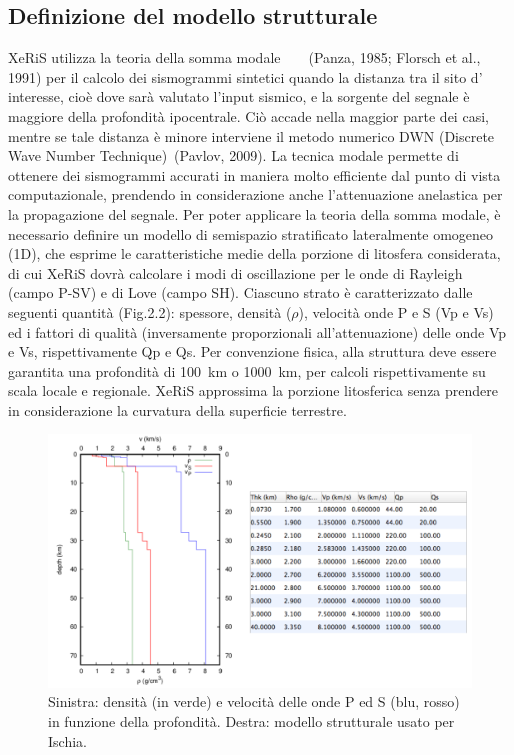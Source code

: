 \documentclass[a4paper,12pt,titlepage]{article}
\begin{document}
\subsection{Definizione del modello strutturale}
XeRiS utilizza la teoria della somma modale ~\nocite{Panza1985} ~\nocite{Florsch} (Panza, 1985; Florsch et al., 1991) per il calcolo dei sismogrammi sintetici quando la distanza tra il sito d' interesse, cioè dove sarà valutato l'input sismico, e la sorgente del segnale è maggiore della profondità ipocentrale. Ciò accade nella maggior parte dei casi, mentre se tale distanza è minore interviene il metodo numerico DWN (Discrete Wave Number Technique)~\nocite{Pavlov2009}(Pavlov, 2009). La tecnica modale permette di ottenere dei sismogrammi accurati in maniera molto efficiente dal punto di vista computazionale, prendendo in considerazione anche l'attenuazione anelastica per la propagazione del segnale. Per poter applicare la teoria della somma modale, è necessario definire un modello di semispazio stratificato lateralmente omogeneo (1D), che esprime le caratteristiche medie della porzione di litosfera considerata, di cui XeRiS dovrà calcolare i modi di oscillazione per le onde di Rayleigh (campo P-SV) e di Love (campo SH). Ciascuno strato è caratterizzato dalle seguenti quantità (Fig.2.2): spessore, densità ($\rho$), velocità onde P e S (Vp e Vs) ed i fattori di qualità (inversamente proporzionali all'attenuazione) delle onde Vp e Vs, rispettivamente Qp e Qs. Per convenzione fisica, alla struttura deve essere garantita una profondità di \SI{100}{\kilo\metre} o \SI{1000}{\kilo\metre}, per calcoli rispettivamente su scala locale e regionale. XeRiS approssima la porzione litosferica senza prendere in considerazione la curvatura della superficie terrestre.

\begin{figure}[htbp]
 \centering
 \includegraphics[width=.5\linewidth]{Img/ModelloStrutturaleIschia.png}
 \caption{Sinistra: densità (in verde) e velocità delle onde P ed S (blu, rosso)
in funzione della profondità. Destra: modello strutturale usato per Ischia.}
 \label{fig:ModStrIsc}
\end{figure}
\end{document}
